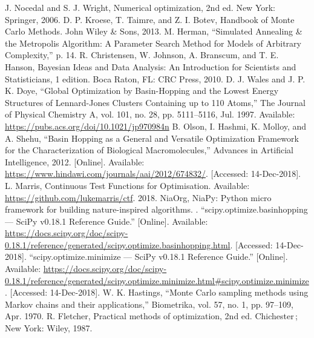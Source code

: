 \documentclass[conference]{IEEEtran}
\begin{document}
\begin{thebibliography}{00}
 J. Nocedal and S. J. Wright, Numerical optimization, 2nd ed. New York: Springer, 2006.
 D. P. Kroese, T. Taimre, and Z. I. Botev, Handbook of Monte Carlo Methods. John Wiley \& Sons, 2013.
 M. Herman, “Simulated Annealing \& the Metropolis Algorithm: A Parameter Search Method for Models of Arbitrary Complexity,” p. 14.
 R. Christensen, W. Johnson, A. Branscum, and T. E. Hanson, Bayesian Ideas and Data Analysis: An Introduction for Scientists and Statisticians, 1 edition. Boca Raton, FL: CRC Press, 2010.
 D. J. Wales and J. P. K. Doye, “Global Optimization by Basin-Hopping and the Lowest Energy Structures of Lennard-Jones Clusters Containing up to 110 Atoms,” The Journal of Physical Chemistry A, vol. 101, no. 28, pp. 5111–5116, Jul. 1997. Available: \href{https://pubs.acs.org/doi/10.1021/jp970984n}{https://pubs.acs.org/doi/10.1021/jp970984n}
 B. Olson, I. Hashmi, K. Molloy, and A. Shehu, “Basin Hopping as a General and Versatile Optimization Framework for the Characterization of Biological Macromolecules,” Advances in Artificial Intelligence, 2012. [Online]. Available:
\href{https://www.hindawi.com/journals/aai/2012/674832/}{https://www.hindawi.com/journals/aai/2012/674832/}. [Accessed: 14-Dec-2018].
 L. Marris, Continuous Test Functions for Optimisation. Available: \href{https://github.com/lukemarris/ctf}{https://github.com/lukemarris/ctf}. 2018.
 NiaOrg, NiaPy: Python micro framework for building nature-inspired algorithms. .
 “scipy.optimize.basinhopping — SciPy v0.18.1 Reference Guide.” [Online]. Available: \href{https://docs.scipy.org/doc/scipy-0.18.1/reference/generated/scipy.optimize.basinhopping.html}{https://docs.scipy.org/doc/scipy-0.18.1/reference/generated/scipy.optimize.basinhopping.html}. [Accessed: 14-Dec-2018].
 “scipy.optimize.minimize — SciPy v0.18.1 Reference Guide.” [Online]. Available: \href{https://docs.scipy.org/doc/scipy-0.18.1/reference/generated/scipy.optimize.minimize.html#scipy.optimize.minimize}{https://docs.scipy.org/doc/scipy-0.18.1/reference/generated/scipy.optimize.minimize.html\#scipy.optimize.minimize}. [Accessed: 14-Dec-2018].
 W. K. Hastings, “Monte Carlo sampling methods using Markov chains and their applications,” Biometrika, vol. 57, no. 1, pp. 97–109, Apr. 1970.
 R. Fletcher, Practical methods of optimization, 2nd ed. Chichester ; New York: Wiley, 1987.
\end{thebibliography}
\vspace{12pt}
\end{document}
